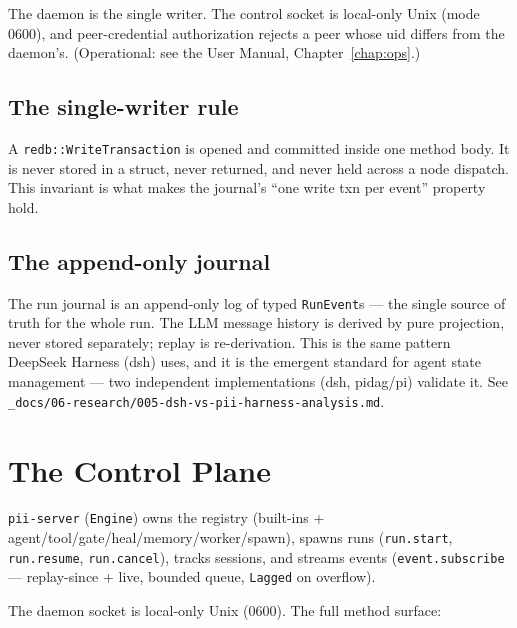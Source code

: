 \documentclass[
	fontsize=10pt,
	twoside=false,
	secnumdepth=2,
	open=any,
]{kaobook}
\begin{document}
The daemon is the single writer. The control socket is local-only Unix
(mode 0600), and peer-credential authorization rejects a peer whose uid
differs from the daemon's. (Operational: see the User Manual,
Chapter~\ref{chap:ops}.)

\section{The single-writer rule}

A \texttt{redb::WriteTransaction} is opened and committed inside one
method body. It is never stored in a struct, never returned, and never
held across a node dispatch. This invariant is what makes the journal's
``one write txn per event'' property hold.

\section{The append-only journal}

The run journal is an append-only log of typed \texttt{RunEvent}s — the
single source of truth for the whole run. The LLM message history is
derived by pure projection, never stored separately; replay is
re-derivation. This is the same pattern DeepSeek Harness (dsh) uses, and
it is the emergent standard for agent state management — two independent
implementations (dsh, pidag/pi) validate it. See
\texttt{\_docs/06-research/005-dsh-vs-pii-harness-analysis.md}.

\chapter{The Control Plane}
\label{chap:control}

\texttt{pii-server} (\texttt{Engine}) owns the registry (built-ins +
agent/tool/gate/heal/memory/worker/spawn), spawns runs
(\texttt{run.start}, \texttt{run.resume}, \texttt{run.cancel}), tracks
sessions, and streams events (\texttt{event.subscribe} — replay-since +
live, bounded queue, \texttt{Lagged} on overflow).

The daemon socket is local-only Unix (0600). The full method surface:
\end{document}

